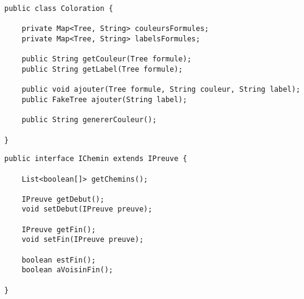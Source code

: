 \documentclass[dvipsnames]{report}
\begin{document}
\begin{lstlisting}[caption={Classe \psverb+Coloration+}, label={lst:Coloration}]
public class Coloration {

	private Map<Tree, String> couleursFormules;
	private Map<Tree, String> labelsFormules;

	public String getCouleur(Tree formule);
	public String getLabel(Tree formule);

	public void ajouter(Tree formule, String couleur, String label);
	public FakeTree ajouter(String label);

	public String genererCouleur();

}
\end{lstlisting}

\begin{lstlisting}[caption={Interface \psverb+IChemin+}, label={lst:IChemin}]
public interface IChemin extends IPreuve {

	List<boolean[]> getChemins();

	IPreuve getDebut();
	void setDebut(IPreuve preuve);

	IPreuve getFin();
	void setFin(IPreuve preuve);

	boolean estFin();
	boolean aVoisinFin();

}
\end{lstlisting}
\end{document}
